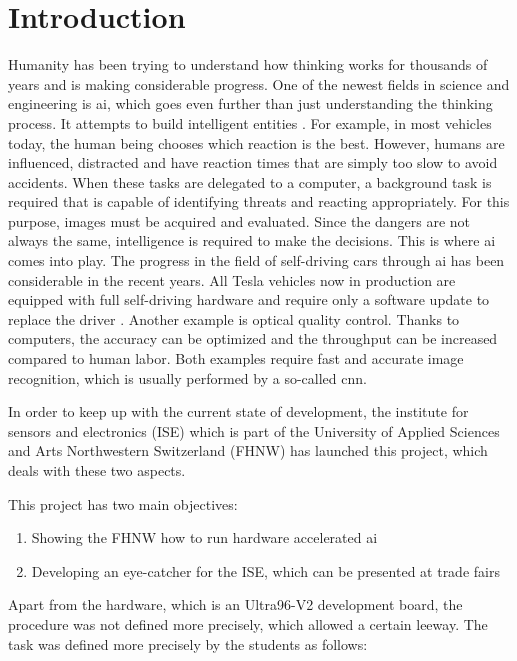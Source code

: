\chapter*{Introduction}
\label{ch:introduction}

Humanity has been trying to understand how thinking works for thousands of years and is making considerable progress.
One of the newest fields in science and engineering is \acrfull{ai}, which goes even further than just understanding the thinking process.
It attempts to build intelligent entities \cite{ai}.
For example, in most vehicles today, the human being chooses which reaction is the best.
However, humans are influenced, distracted and have reaction times that are simply too slow to avoid accidents.
When these tasks are delegated to a computer, a background task is required that is capable of identifying threats and reacting appropriately.
For this purpose, images must be acquired and evaluated.
Since the dangers are not always the same, intelligence is required to make the decisions.
This is where \acrshort{ai} comes into play.
The progress in the field of self-driving cars through \acrshort{ai} has been considerable in the recent years.
All Tesla vehicles now in production are equipped with full self-driving hardware and require only a software update to replace the driver \cite{tesla_self_driving_cars}.
Another example is optical quality control.
Thanks to computers, the accuracy can be optimized and the throughput can be increased compared to human labor.
Both examples require fast and accurate image recognition, which is usually performed by a so-called \acrfull{cnn}.

In order to keep up with the current state of development, the institute for sensors and electronics (ISE) which is part of the University of Applied Sciences and Arts Northwestern Switzerland (FHNW) has launched this project, which deals with these two aspects.

This project has two main objectives:

\begin{enumerate}
	\item Showing the FHNW how to run hardware accelerated \acrshort{ai}
	\item Developing an eye-catcher for the ISE, which can be presented at trade fairs
\end{enumerate}

Apart from the hardware, which is an Ultra96-V2 development board, the procedure was not defined more precisely, which allowed a certain leeway.
The task was defined more precisely by the students as follows:

